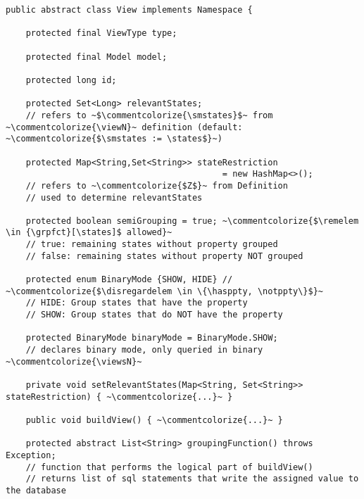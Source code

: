\documentclass[preview]{standalone}
\begin{document}
	\begin{lstlisting}[style=javaStyle, caption={Most relevant attributes and methods of class \texttt{View}}, label={lst:classview}]
public abstract class View implements Namespace {
	
	protected final ViewType type;
	
	protected final Model model;
	
	protected long id; 
	
	protected Set<Long> relevantStates; 
	// refers to ~$\commentcolorize{\smstates}$~ from ~\commentcolorize{\viewN}~ definition (default: ~\commentcolorize{$\smstates := \states$}~)
	
	protected Map<String,Set<String>> stateRestriction 
										   = new HashMap<>();
	// refers to ~\commentcolorize{$Z$}~ from Definition 
	// used to determine relevantStates
	
	protected boolean semiGrouping = true; ~\commentcolorize{$\remelem \in {\grpfct}[\states]$ allowed}~
	// true: remaining states without property grouped
	// false: remaining states without property NOT grouped
	
	protected enum BinaryMode {SHOW, HIDE} // ~\commentcolorize{$\disregardelem \in \{\hasppty, \notppty\}$}~
	// HIDE: Group states that have the property 
	// SHOW: Group states that do NOT have the property
	
	protected BinaryMode binaryMode = BinaryMode.SHOW;
	// declares binary mode, only queried in binary ~\commentcolorize{\viewsN}~
	
	private void setRelevantStates(Map<String, Set<String>> stateRestriction) { ~\commentcolorize{...}~ }
	
	public void buildView() { ~\commentcolorize{...}~ }
		
	protected abstract List<String> groupingFunction() throws Exception;
	// function that performs the logical part of buildView()
	// returns list of sql statements that write the assigned value to the database
	

\end{lstlisting}
	
\end{document}
